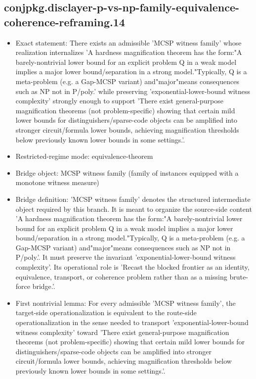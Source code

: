 \documentclass[11pt]{article}
\begin{document}
\subsection*{conjpkg.disclayer-p-vs-np-family-equivalence-coherence-reframing.14}
\begin{itemize}
\item Exact statement: There exists an admissible 'MCSP witness family' whose realization internalizes 'A hardness magnification theorem has the form:"A barely-nontrivial lower bound for an explicit problem Q in a weak model implies a major lower bound/separation in a strong model."Typically, Q is a meta-problem (e.g. a Gap-MCSP variant) and"major"means consequences such as NP not in P/poly.' while preserving 'exponential-lower-bound witness complexity' strongly enough to support 'There exist general-purpose magnification theorems (not problem-specific) showing that certain mild lower bounds for distinguishers/sparse-code objects can be amplified into stronger circuit/formula lower bounds, achieving magnification thresholds below previously known lower bounds in some settings.'.
\item Restricted-regime mode: equivalence-theorem
\item Bridge object: MCSP witness family (family of instances equipped with a monotone witness measure)
\item Bridge definition: 'MCSP witness family' denotes the structured intermediate object required by this branch. It is meant to organize the source-side content 'A hardness magnification theorem has the form:"A barely-nontrivial lower bound for an explicit problem Q in a weak model implies a major lower bound/separation in a strong model."Typically, Q is a meta-problem (e.g. a Gap-MCSP variant) and"major"means consequences such as NP not in P/poly.'. It must preserve the invariant 'exponential-lower-bound witness complexity'. Its operational role is 'Recast the blocked frontier as an identity, equivalence, transport, or coherence problem rather than as a missing brute-force bridge.'.
\item First nontrivial lemma: For every admissible 'MCSP witness family', the target-side operationalization is equivalent to the route-side operationalization in the sense needed to transport 'exponential-lower-bound witness complexity' toward 'There exist general-purpose magnification theorems (not problem-specific) showing that certain mild lower bounds for distinguishers/sparse-code objects can be amplified into stronger circuit/formula lower bounds, achieving magnification thresholds below previously known lower bounds in some settings.'.

\end{itemize}
\end{document}
